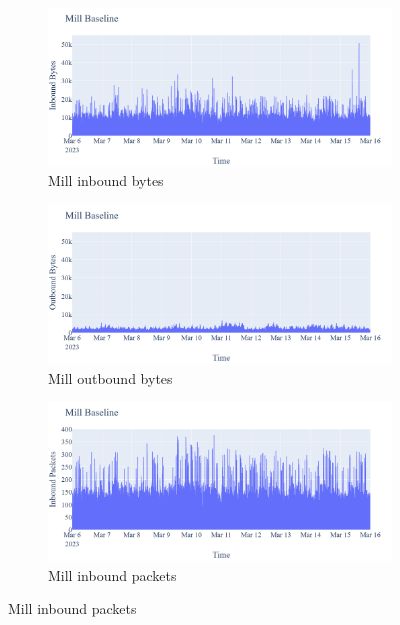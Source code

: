 \begin{figure}[H]
    \centering
    \begin{subfigure}[b]{0.4\textwidth}
        \includegraphics[width=\textwidth]{figures/Mill_Baseline_InboundBytes.png}
        \caption{Mill inbound bytes}
    \end{subfigure}
    \begin{subfigure}[b]{0.4\textwidth}
        \includegraphics[width=\textwidth]{figures/Mill_Baseline_OutboundBytes.png}
        \caption{Mill outbound bytes}
    \end{subfigure}
    \begin{subfigure}[b]{0.4\textwidth}
        \includegraphics[width=\textwidth]{figures/Mill_Baseline_InboundPackets.png}
        \caption{Mill inbound packets}

\end{subfigure}
\end{figure}
